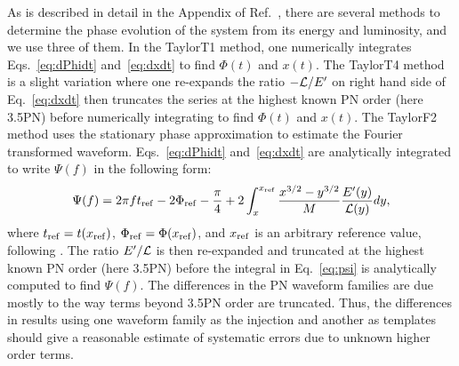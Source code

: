 \documentclass[twocolumn,prd,amssymb,aps,nofootinbib,showpacs,epsf]{revtex4}
\begin{document}
As is described in detail in the Appendix of Ref.~\cite{WadeCreightonOchsner2014}, there are several methods to determine the phase evolution of the system from its energy and luminosity, and we use three of them.  In the TaylorT1 method, one numerically integrates Eqs.~\eqref{eq:dPhidt} and~\eqref{eq:dxdt} to find $\Phi(t)$ and $x(t)$. The TaylorT4 method is a slight variation where one re-expands the ratio $-{\cal L}/E^\prime$ on right hand side of Eq.~\eqref{eq:dxdt} then truncates the series at the highest known PN order (here 3.5PN) before numerically integrating to find $\Phi(t)$ and $x(t)$. The TaylorF2 method uses the stationary phase approximation to estimate the Fourier transformed waveform.  Eqs.~\eqref{eq:dPhidt} and~\eqref{eq:dxdt} are analytically integrated to write $\Psi(f)$ in the following form:
\begin{equation}
\label{eq:psi}
\Psi(f)=2\pi f t_{\rm ref} - 2\Phi_{\rm ref} -\frac{\pi}{4}+ 2\int_x^{x_{\rm ref}}\frac{x^{3/2} - y^{3/2}}{M}\frac{E^\prime(y)}{{\cal L}(y)}dy,
\end{equation}
where $t_{\rm ref}=t(x_{\rm ref})$, $\Phi_{\rm ref}=\Phi(x_{\rm ref})$, and $x_{\rm ref}$ is an arbitrary reference value, following \cite{BuonannoIyerOchsner2009}.  The ratio $E^\prime/{\cal L}$ is then re-expanded and truncated at the highest known PN order (here 3.5PN) before the integral in Eq.~\eqref{eq:psi} is analytically computed to find $\Psi(f)$.  The differences in the PN waveform families are due mostly to the way terms beyond 3.5PN order are truncated.  Thus, the differences in results using one waveform family as the injection and another as templates should give a reasonable estimate of systematic errors due to unknown higher order terms.
\end{document}
